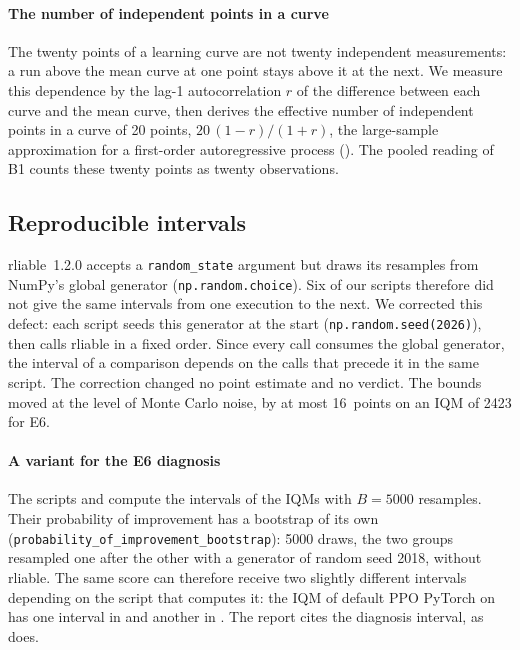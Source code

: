\paragraph{The number of independent points in a curve}
The twenty points of a learning curve are not twenty independent measurements: a run above the mean curve at
one point stays above it at the next. We measure this dependence by the lag-1 autocorrelation $r$ of
the difference between each curve and the mean curve, then derives the effective number of independent points
in a curve of 20 points, $20\,(1-r)/(1+r)$, the large-sample approximation for a first-order autoregressive
process
(). The pooled reading of B1 counts these twenty points as twenty observations.

\subsection{Reproducible intervals}\label{sec:reproductibilite-bootstrap}
rliable~1.2.0 accepts a \texttt{random\_state} argument but draws its resamples from NumPy's global generator
(\texttt{np.random.choice}). Six of our scripts therefore did not give the same intervals from one execution
to the next. We corrected this defect: each script seeds this generator at the start (\texttt{np.random.seed(2026)}),
then calls rliable in a fixed order. Since every call consumes the global generator, the interval of a comparison
depends on the calls that precede it in the same script. The correction changed no point estimate and no
verdict. The bounds moved at the level of Monte Carlo noise, by at most 16~points on an IQM of \num{2423} for
E6.

\paragraph{A variant for the E6 diagnosis}
The scripts  and  compute the intervals of the IQMs with
$B=\num{5000}$ resamples. Their probability of improvement has a bootstrap of its own
(\texttt{probability\_of\_improvement\_bootstrap}): \num{5000} draws, the two groups resampled one after the
other with a generator of random seed 2018, without rliable. The same score can therefore receive two slightly
different intervals depending on the script that computes it: the IQM of default PPO PyTorch on
 has one interval in  and another in . The report cites the
diagnosis interval, as  does.

